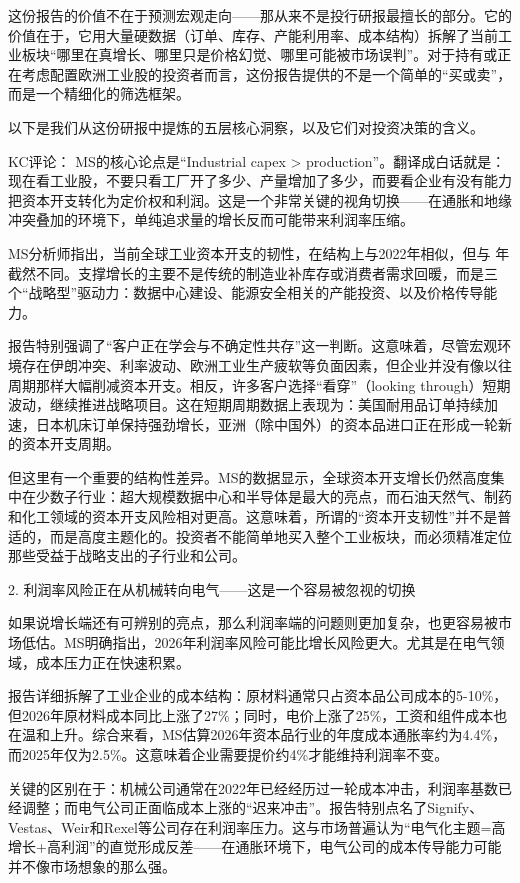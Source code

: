 \documentclass[11pt]{ctexart}
\begin{document}
这份报告的价值不在于预测宏观走向——那从来不是投行研报最擅长的部分。它的价值在于，它用大量硬数据（订单、库存、产能利用率、成本结构）拆解了当前工业板块“哪里在真增长、哪里只是价格幻觉、哪里可能被市场误判”。对于持有或正在考虑配置欧洲工业股的投资者而言，这份报告提供的不是一个简单的“买或卖”，而是一个精细化的筛选框架。

以下是我们从这份研报中提炼的五层核心洞察，以及它们对投资决策的含义。

KC评论： MS的核心论点是“Industrial capex > production”。翻译成白话就是：现在看工业股，不要只看工厂开了多少、产量增加了多少，而要看企业有没有能力把资本开支转化为定价权和利润。这是一个非常关键的视角切换——在通胀和地缘冲突叠加的环境下，单纯追求量的增长反而可能带来利润率压缩。

MS分析师指出，当前全球工业资本开支的韧性，在结构上与2022年相似，但与 年截然不同。支撑增长的主要不是传统的制造业补库存或消费者需求回暖，而是三个“战略型”驱动力：数据中心建设、能源安全相关的产能投资、以及价格传导能力。

报告特别强调了“客户正在学会与不确定性共存”这一判断。这意味着，尽管宏观环境存在伊朗冲突、利率波动、欧洲工业生产疲软等负面因素，但企业并没有像以往周期那样大幅削减资本开支。相反，许多客户选择“看穿”（looking through）短期波动，继续推进战略项目。这在短期周期数据上表现为：美国耐用品订单持续加速，日本机床订单保持强劲增长，亚洲（除中国外）的资本品进口正在形成一轮新的资本开支周期。

但这里有一个重要的结构性差异。MS的数据显示，全球资本开支增长仍然高度集中在少数子行业：超大规模数据中心和半导体是最大的亮点，而石油天然气、制药和化工领域的资本开支风险相对更高。这意味着，所谓的“资本开支韧性”并不是普适的，而是高度主题化的。投资者不能简单地买入整个工业板块，而必须精准定位那些受益于战略支出的子行业和公司。

2. 利润率风险正在从机械转向电气——这是一个容易被忽视的切换

如果说增长端还有可辨别的亮点，那么利润率端的问题则更加复杂，也更容易被市场低估。MS明确指出，2026年利润率风险可能比增长风险更大。尤其是在电气领域，成本压力正在快速积累。

报告详细拆解了工业企业的成本结构：原材料通常只占资本品公司成本的5-10\%，但2026年原材料成本同比上涨了27\%；同时，电价上涨了25\%，工资和组件成本也在温和上升。综合来看，MS估算2026年资本品行业的年度成本通胀率约为4.4\%，而2025年仅为2.5\%。这意味着企业需要提价约4\%才能维持利润率不变。

关键的区别在于：机械公司通常在2022年已经经历过一轮成本冲击，利润率基数已经调整；而电气公司正面临成本上涨的“迟来冲击”。报告特别点名了Signify、Vestas、Weir和Rexel等公司存在利润率压力。这与市场普遍认为“电气化主题=高增长+高利润”的直觉形成反差——在通胀环境下，电气公司的成本传导能力可能并不像市场想象的那么强。
\end{document}
